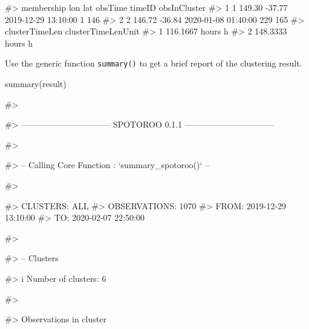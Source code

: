 \begin{Schunk}
\begin{Soutput}
#>   membership    lon    lat             obsTime timeID obsInCluster
#> 1          1 149.30 -37.77 2019-12-29 13:10:00      1          146
#> 2          2 146.72 -36.84 2020-01-08 01:40:00    229          165
#>   clusterTimeLen clusterTimeLenUnit
#> 1 116.1667 hours                  h
#> 2 148.3333 hours                  h
\end{Soutput}
\end{Schunk}

Use the generic function \texttt{summary()} to get a brief report of the
clustering result.

\begin{Schunk}
\begin{Sinput}
summary(result)
\end{Sinput}
\begin{Soutput}
#> 
\end{Soutput}
\begin{Soutput}
#> -------------------------------- SPOTOROO 0.1.1 --------------------------------
\end{Soutput}
\begin{Soutput}
#> 
\end{Soutput}
\begin{Soutput}
#> -- Calling Core Function : `summary_spotoroo()` --
\end{Soutput}
\begin{Soutput}
#> 
\end{Soutput}
\begin{Soutput}
#> CLUSTERS: ALL
#> OBSERVATIONS: 1070
#> FROM: 2019-12-29 13:10:00
#> TO:   2020-02-07 22:50:00
\end{Soutput}
\begin{Soutput}
#> 
\end{Soutput}
\begin{Soutput}
#> -- Clusters
\end{Soutput}
\begin{Soutput}
#> i Number of clusters: 6
\end{Soutput}
\begin{Soutput}
#> 
\end{Soutput}
\begin{Soutput}
#> Observations in cluster
\end{Soutput}
\begin{Soutput}

\end{Soutput}
\end{Schunk}
